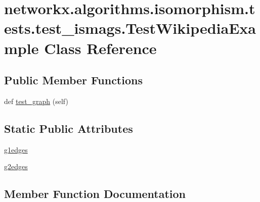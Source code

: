 \hypertarget{classnetworkx_1_1algorithms_1_1isomorphism_1_1tests_1_1test__ismags_1_1TestWikipediaExample}{}\section{networkx.\+algorithms.\+isomorphism.\+tests.\+test\+\_\+ismags.\+Test\+Wikipedia\+Example Class Reference}
\label{classnetworkx_1_1algorithms_1_1isomorphism_1_1tests_1_1test__ismags_1_1TestWikipediaExample}
\subsection*{Public Member Functions}
\begin{DoxyCompactItemize}
\item 
def \hyperlink{classnetworkx_1_1algorithms_1_1isomorphism_1_1tests_1_1test__ismags_1_1TestWikipediaExample_a7f5448d4122559fb2c035f3f10ad3fa1}{test\+\_\+graph} (self)
\end{DoxyCompactItemize}
\subsection*{Static Public Attributes}
\begin{DoxyCompactItemize}
\item 
\hyperlink{classnetworkx_1_1algorithms_1_1isomorphism_1_1tests_1_1test__ismags_1_1TestWikipediaExample_a5b4207c82c13788fe512250ad7405235}{g1edges}
\item 
\hyperlink{classnetworkx_1_1algorithms_1_1isomorphism_1_1tests_1_1test__ismags_1_1TestWikipediaExample_a4eb1dd8d684ce0724a98d2ef258dd500}{g2edges}
\end{DoxyCompactItemize}


\subsection{Member Function Documentation}
\mbox{\label{classnetworkx_1_1algorithms_1_1isomorphism_1_1tests_1_1test__ismags_1_1TestWikipediaExample_a7f5448d4122559fb2c035f3f10ad3fa1}} 
